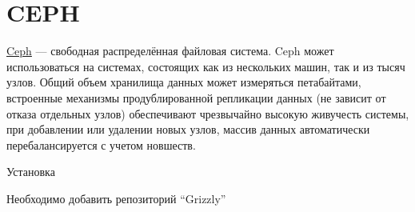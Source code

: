 \documentclass[letterpaper,10pt,russian]{sphinxmanual}
\begin{document}
\chapter{CEPH}
\label{README:ceph}\label{README:link}\begin{figure}[htbp]\begin{flushright}

\end{flushright}\end{figure}

\href{http://ceph.com}{Ceph} — свободная распределённая файловая система. Ceph может использоваться на системах, состоящих как из нескольких машин, так и из тысяч узлов. Общий объем хранилища данных может измеряться петабайтами, встроенные механизмы продублированной репликации данных (не зависит от отказа отдельных узлов) обеспечивают чрезвычайно высокую живучесть системы, при добавлении или удалении новых узлов, массив данных автоматически перебалансируется с учетом новшеств.

Установка



Необходимо добавить репозиторий ``Grizzly''

\end{document}
